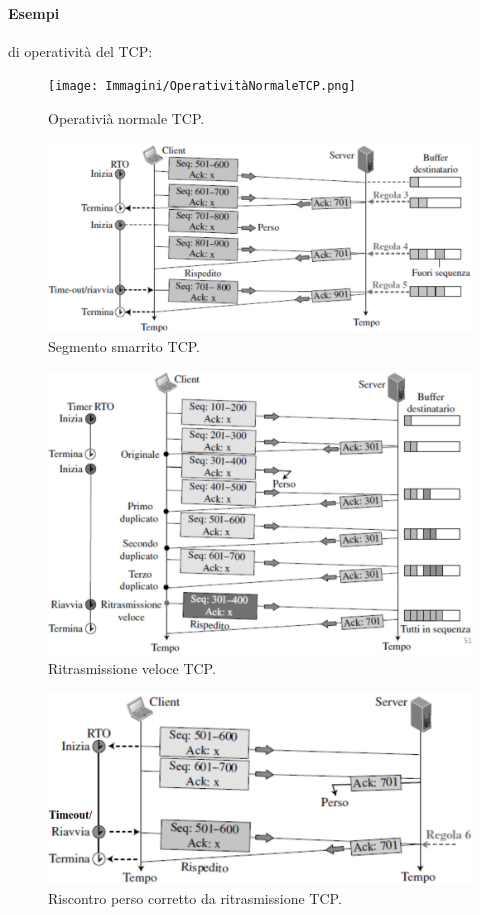\paragraph{Esempi} di operatività del TCP:
\begin{figure}[h]
    \centering
    \texttt{[image: Immagini/OperativitàNormaleTCP.png]}
    \caption{Operativià normale TCP.}
\end{figure}
\begin{figure}[h]
    \centering
    \includegraphics[scale=0.26]{Immagini/TCPSegmentoSmarrito.png}
    \caption{Segmento smarrito TCP.}
\end{figure}
\begin{figure}[h]
    \centering
    \includegraphics[scale=0.29]{Immagini/TCPRitrasmissioneVeloce.png}
    \caption{Ritrasmissione veloce TCP.}
\end{figure}
\begin{figure}[h]
    \centering
    \includegraphics[scale=0.27]{Immagini/TCPRiscontroPersoCorrettoDaRitrasmissione.png}
    \caption{Riscontro perso corretto da ritrasmissione TCP.}
\end{figure}
